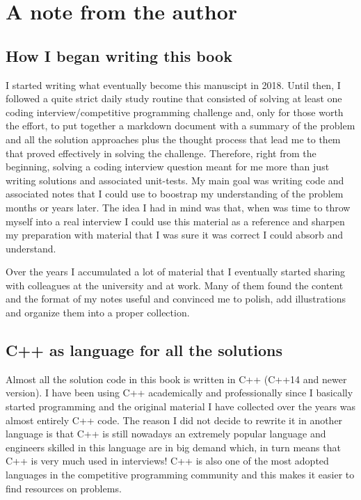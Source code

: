 \chapter*{A note from the author}

\section*{How I began writing this book}
I started writing what eventually become this manuscipt in 2018. 
Until then, I followed a quite strict daily study routine that consisted of solving at least one coding interview/competitive programming challenge and, only for those worth the effort, to put together a markdown document with a summary of the problem and all the solution approaches plus the thought process that lead me to them that proved effectively in solving the challenge. 
Therefore, right from the beginning, solving a coding interview question meant for me more than just writing solutions and associated unit-tests. My main goal was writing code and associated notes that I could use to boostrap my understanding of the problem months or years later.
The idea I had in mind was that, when was time to throw myself into a real interview I could use this material as a reference and sharpen my preparation with material that I was sure it was correct I could absorb and understand.

Over the years I accumulated a lot of material that I eventually started sharing with colleagues at the university and at work. 
Many of them found the content and the format of my notes useful and convinced me to polish, add illustrations and organize them into a proper collection.

\section*{C++ as language for all the solutions}
Almost all the solution code in this book is written in C++ (C++14 and newer version). 
I have been using C++ academically and professionally since I basically started programming and the original material I have collected over the years was almost entirely C++ code. 
The reason I did not decide to rewrite it in another language is that C++ is still nowadays an extremely popular language and engineers skilled in this language are in big demand which, in turn means that C++ is very much used in interviews!
C++ is also one of the most adopted languages in the competitive programming community and this makes it easier to find resources on problems.

